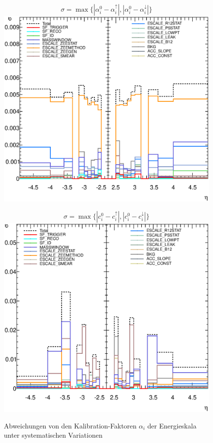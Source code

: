 \begin{figure}[h]
    \begin{minipage}[t]{0.48\textwidth}
        \centering
        \[
            \sigma = \max\{ | \alpha_i^0 - \alpha_i^\uparrow   | ,
                            | \alpha_i^0 - \alpha_i^\downarrow | \}
        \]
        \includegraphics[width=1.\textwidth]{plots/alpha_uncert}
        \captionsetup{format=plain}
        \caption{Abweichungen von den Kalibration-Faktoren $\alpha_i$ der
            Energieskala unter systematischen Variationen}
        \label{fig:alpha_uncert}
    \end{minipage}
    \hfill
    \begin{minipage}[t]{0.48\textwidth}
        \centering
        \[
            \sigma = \max\{ | c_i^0 - c_i^\uparrow   | ,
                            | c_i^0 - c_i^\downarrow | \}
        \]
        \includegraphics[width=1.\textwidth]{plots/cdata_uncert}

\end{minipage}
\end{figure}
